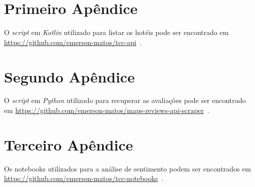 
\begin{apendicesenv}

\partapendices
\chapter{Primeiro Apêndice}
\label{apendice:script_listar_hoteis}
O \emph{script} em \emph{Kotlin} utilizado para listar os hotéis pode ser encontrado em \url{https://github.com/emerson-matos/tcc-api}~\cite{scriptKotlinBuscarHoteis}.

\chapter{Segundo Apêndice}
\label{apendice:scrapper}
O \emph{script} em \emph{Python} utilizado para recuperar as avaliações pode ser encontrado em \url{https://github.com/emerson-matos/maps-reviews-api-scraper}~\cite{emersonScrapper2024}.


\chapter{Terceiro Apêndice}
\label{apendice:notebooks}
Os notebooks utilizados para a análise de sentimento podem ser encontrados em \url{https://github.com/emerson-matos/tcc-notebooks}~\cite{notebooks_2024}.



\end{apendicesenv}

